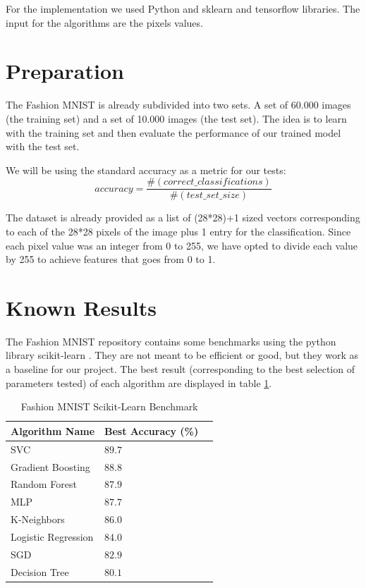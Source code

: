 \documentclass[twoside,twocolumn]{article}
\begin{document}
    For the implementation we used Python and sklearn\cite{scikitlearn} and tensorflow \cite{tensorflow} libraries. The input for the algorithms are the pixels values.
	


\section{Preparation}

The Fashion MNIST is already subdivided into two sets. A set of 60.000 images (the training set)
and a set of 10.000 images (the test set). The idea is to learn with the training set and then
evaluate the performance of our trained model with the test set.

We will be using the standard accuracy as a metric for our tests:
\begin{equation}
\label{eq:acc}
accuracy = \frac{\#(correct\_classifications)}{\#(test\_set\_size)}
\end{equation}

The dataset is already provided as a list of (28*28)+1 sized vectors corresponding
to each of the 28*28 pixels of the image plus 1 entry for the classification.
Since each pixel value was an integer from 0 to 255, we have opted to divide
each value by 255 to achieve features that goes from 0 to 1.


\section{Known Results}

The Fashion MNIST repository contains some benchmarks using the python library
scikit-learn \cite{scikitlearnbenchmark}. They are not meant
to be efficient or good, but they work as a baseline for our project.
The best result (corresponding to the best selection of parameters tested)
of each algorithm are displayed in table \ref{table:scikit-benchmark}.

\begin{table}
\centering
\begin{tabular}{llr}
\toprule
Algorithm Name & Best Accuracy (\%) \\
\midrule
SVC & $89.7$ \\
Gradient Boosting & $88.8$ \\
Random Forest & $87.9$ \\
MLP & $87.7$ \\
K-Neighbors & $86.0$ \\
Logistic Regression & $84.0$ \\
SGD & $82.9$ \\
Decision Tree & $80.1$ \\
\bottomrule
\end{tabular}
\caption{Fashion MNIST Scikit-Learn Benchmark \cite{scikitlearnbenchmark} }
\label{table:scikit-benchmark}
\end{table}
\end{document}
